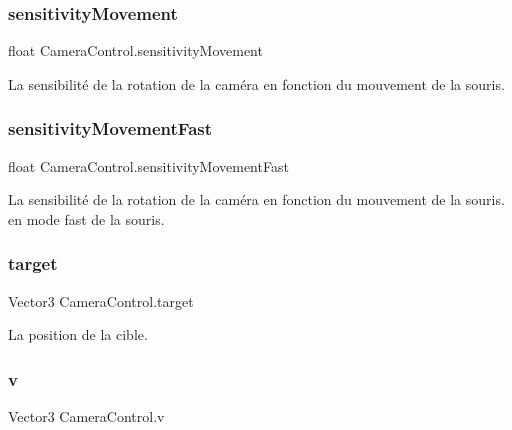 \subsubsection{\texorpdfstring{sensitivity\+Movement}{sensitivityMovement}}
{\footnotesize\ttfamily float Camera\+Control.\+sensitivity\+Movement\hspace{0.3cm}{\ttfamily [private]}}



La sensibilité de la rotation de la caméra en fonction du mouvement de la souris. 

\mbox{\label{class_camera_control_a16be738f9e3af72fbcf8ab2444c188a7}} 
\subsubsection{\texorpdfstring{sensitivity\+Movement\+Fast}{sensitivityMovementFast}}
{\footnotesize\ttfamily float Camera\+Control.\+sensitivity\+Movement\+Fast\hspace{0.3cm}{\ttfamily [private]}}



La sensibilité de la rotation de la caméra en fonction du mouvement de la souris. en mode fast de la souris. 

\mbox{\label{class_camera_control_abd85110007706858516ca14f5bfc130b}} 
\subsubsection{\texorpdfstring{target}{target}}
{\footnotesize\ttfamily Vector3 Camera\+Control.\+target\hspace{0.3cm}{\ttfamily [private]}}



La position de la cible. 

\mbox{\label{class_camera_control_a691c217272275657d242c27b496964b6}} 
\subsubsection{\texorpdfstring{v}{v}}
{\footnotesize\ttfamily Vector3 Camera\+Control.\+v\hspace{0.3cm}{\ttfamily [private]}}



